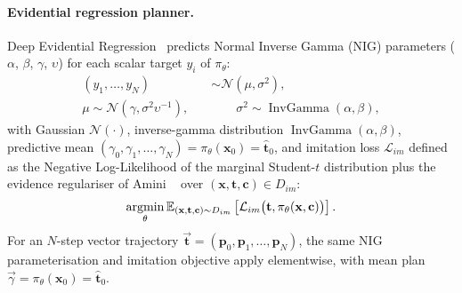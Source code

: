 \paragraph{Evidential regression planner.} Deep Evidential Regression~\cite{amini2020deepevidential} predicts Normal Inverse Gamma (NIG) parameters ($\alpha$, $\beta$, $\gamma$, $\upsilon$) for each scalar target $y_i$ of $\pi_\theta$:
\begin{align}
  (y_1, \dots, y_N) &\sim \mathcal{N}(\mu, \sigma^2), \nonumber \\
  \mu \sim \mathcal{N}(\gamma, \sigma^2 \upsilon^{-1}), \quad & \qquad \sigma^2 \sim \operatorname{InvGamma}(\alpha, \beta),
  \label{centaur:eq:evidential}
\end{align}
with Gaussian $\mathcal{N}(\cdot)$, inverse-gamma distribution $\operatorname{InvGamma}(\alpha,\beta)$, predictive mean $(\gamma_0, \gamma_1, \dots, \gamma_N) = \pi_\theta(\mathbf{x}_0) = \hat{\mathbf{t}}_0$, and imitation loss $\mathcal{L}_{im}$ defined as the Negative Log-Likelihood of the marginal Student-$t$ distribution plus the evidence regulariser of Amini \etal~\cite{amini2020deepevidential} over $(\mathbf{x},\mathbf{t},\mathbf{c}) \in D_{im}$:
\begin{equation}
  \label{centaur:eq:objective}
  \mathop{\mathrm{argmin}}\limits_{\theta} \mathbb{E}_{(\mathbf{x},\mathbf{t},\mathbf{c})\sim D_{im}} \left[\mathcal{L}_{im}\big(\mathbf{t}, \pi_\theta(\mathbf{x},\mathbf{c})\big)\right].
\end{equation}
For an $N$-step vector trajectory $\vec{\mathbf{t}} = (\mathbf{p}_0, \mathbf{p}_1, \dots, \mathbf{p}_N)$, the same NIG parameterisation and imitation objective apply elementwise, with mean plan $\vec{\gamma} = \pi_\theta(\mathbf{x}_0) = \hat{\mathbf{t}}_0$.

